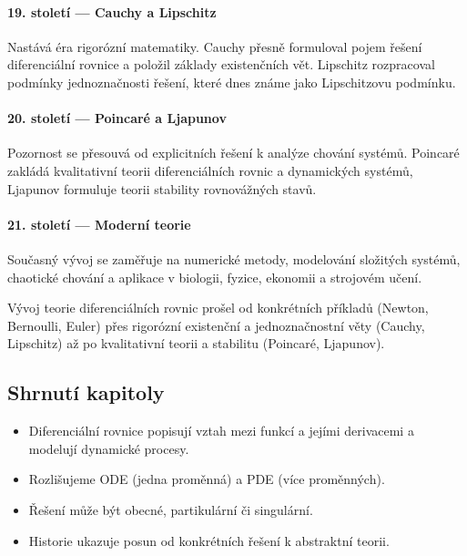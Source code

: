     \paragraph*{19. století — Cauchy a Lipschitz}
    Nastává éra rigorózní matematiky. 
    Cauchy přesně formuloval pojem řešení diferenciální rovnice a položil základy existenčních vět. 
    Lipschitz rozpracoval podmínky jednoznačnosti řešení, které dnes známe jako Lipschitzovu podmínku.
    
    \spc
    
    \paragraph*{20. století — Poincaré a Ljapunov}
    Pozornost se přesouvá od explicitních řešení k analýze chování systémů. 
    Poincaré zakládá kvalitativní teorii diferenciálních rovnic a dynamických systémů, 
    Ljapunov formuluje teorii stability rovnovážných stavů.
    
    \spc
    
    \paragraph*{21. století — Moderní teorie}
    Současný vývoj se zaměřuje na numerické metody, modelování složitých systémů, chaotické chování a aplikace v biologii, fyzice, ekonomii a strojovém učení.
    

\begin{remark}
Vývoj teorie diferenciálních rovnic prošel od konkrétních příkladů (Newton, Bernoulli, Euler) přes rigorózní existenční a jednoznačnostní věty (Cauchy, Lipschitz) až po kvalitativní teorii a stabilitu (Poincaré, Ljapunov).
\end{remark}

\spc

\subsection*{Shrnutí kapitoly}
\begin{itemize}
\item Diferenciální rovnice popisují vztah mezi funkcí a jejími derivacemi a modelují dynamické procesy.
\item Rozlišujeme ODE (jedna proměnná) a PDE (více proměnných).
\item Řešení může být obecné, partikulární či singulární.
\item Historie ukazuje posun od konkrétních řešení k abstraktní teorii.
\end{itemize}

\spc



